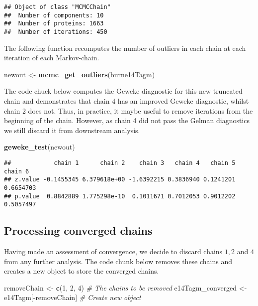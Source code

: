 \documentclass[]{article}
\newenvironment{Shaded}{\begin{snugshade}}{\end{snugshade}}
\newcommand{\KeywordTok}[1]{\textcolor[rgb]{0.13,0.29,0.53}{\textbf{{#1}}}}
\newcommand{\DecValTok}[1]{\textcolor[rgb]{0.00,0.00,0.81}{{#1}}}
\newcommand{\StringTok}[1]{\textcolor[rgb]{0.31,0.60,0.02}{{#1}}}
\newcommand{\CommentTok}[1]{\textcolor[rgb]{0.56,0.35,0.01}{\textit{{#1}}}}
\newcommand{\NormalTok}[1]{{#1}}
\begin{document}
\begin{verbatim}
## Object of class "MCMCChain"
##  Number of components: 10 
##  Number of proteins: 1663 
##  Number of iterations: 450
\end{verbatim}

The following function recomputes the number of outliers in each chain
at each iteration of each Markov-chain.

\begin{Shaded}
\begin{Highlighting}[]
\NormalTok{newout <-}\StringTok{ }\KeywordTok{mcmc_get_outliers}\NormalTok{(burne14Tagm)}
\end{Highlighting}
\end{Shaded}

The code chuck below computes the Geweke diagnostic for this new
truncated chain and demonstrates that chain 4 has an improved Geweke
diagnostic, whilst chain 2 does not. Thus, in practice, it maybe useful
to remove iterations from the beginning of the chain. However, as chain
4 did not pass the Gelman diagnostics we still discard it from
downstream analysis.

\begin{Shaded}
\begin{Highlighting}[]
\KeywordTok{geweke_test}\NormalTok{(newout)}
\end{Highlighting}
\end{Shaded}

\begin{verbatim}
##            chain 1      chain 2    chain 3   chain 4   chain 5   chain 6
## z.value -0.1455345 6.379618e+00 -1.6392215 0.3836940 0.1241201 0.6654703
## p.value  0.8842889 1.775298e-10  0.1011671 0.7012053 0.9012202 0.5057497
\end{verbatim}

\subsection{Processing converged
chains}\label{processing-converged-chains}

Having made an assessment of convergence, we decide to discard chains
\(1,2\) and \(4\) from any further analysis. The code chunk below
removes these chains and creates a new object to store the converged
chains.

\begin{Shaded}
\begin{Highlighting}[]
\NormalTok{removeChain <-}\StringTok{ }\KeywordTok{c}\NormalTok{(}\DecValTok{1}\NormalTok{, }\DecValTok{2}\NormalTok{, }\DecValTok{4}\NormalTok{) }\CommentTok{# The chains to be removed}
\NormalTok{e14Tagm_converged <-}\StringTok{ }\NormalTok{e14Tagm[-removeChain] }\CommentTok{# Create new object}
\end{Highlighting}
\end{Shaded}
\end{document}
